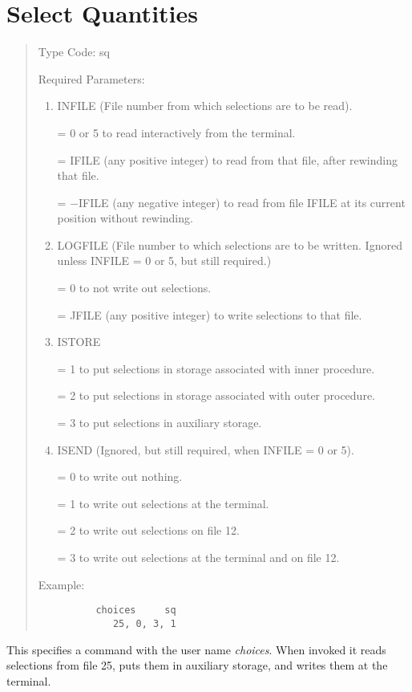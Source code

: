 \section{Select Quantities}  
\begin{quotation}
\noindent     Type Code:  sq
\vspace{5mm}

\noindent Required Parameters:
\begin{enumerate}
       \item  INFILE (File number from which selections are to be read).

              = 0 or 5 to read interactively from the terminal.

              = IFILE (any positive integer) to read from that file,
after rewinding that \hspace*{1em}file.

              = $-$IFILE (any negative integer) to read from file IFILE at
its current \hspace*{1em}position without rewinding.

       \item  LOGFILE (File number to which selections are to be written.  Ignored unless INFILE = 0 or 5, but still required.)

              = 0 to not write out selections.

              = JFILE (any positive integer) to write selections to that file.


       \item  ISTORE

	          = 1 to put selections in storage associated with inner
			  procedure.

	          = 2 to put selections in storage associated with outer
			  procedure.

	          = 3 to put selections in auxiliary storage.



       \item  ISEND (Ignored, but still required, when INFILE = 0 or 5).

              = 0 to write out nothing.

              = 1 to write out selections at the terminal.

              = 2 to write out selections on file 12.

              = 3 to write out selections at the terminal and on file 12.
\end{enumerate}

\vspace{5mm}
\noindent Example:
\begin{verbatim}
          choices     sq
             25, 0, 3, 1
\end{verbatim}
\end{quotation}
This specifies a command with the user name {\em choices}.  When invoked it reads selections from file 25, puts them in auxiliary storage, and writes them at the terminal.

